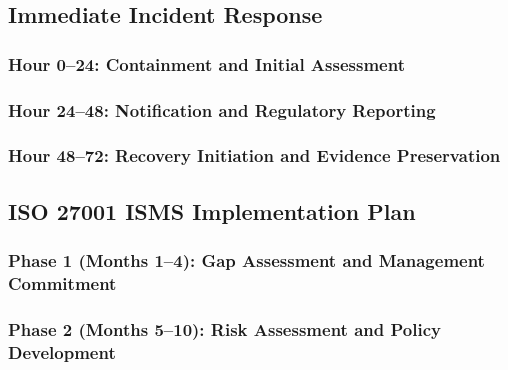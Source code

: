 
\subsection{Immediate Incident Response}


\subsubsection{Hour 0--24: Containment and Initial Assessment}


\subsubsection{Hour 24--48: Notification and Regulatory Reporting}


\subsubsection{Hour 48--72: Recovery Initiation and Evidence Preservation}



\subsection{ISO 27001 ISMS Implementation Plan}


\subsubsection{Phase 1 (Months 1--4): Gap Assessment and Management Commitment}


\subsubsection{Phase 2 (Months 5--10): Risk Assessment and Policy Development}

